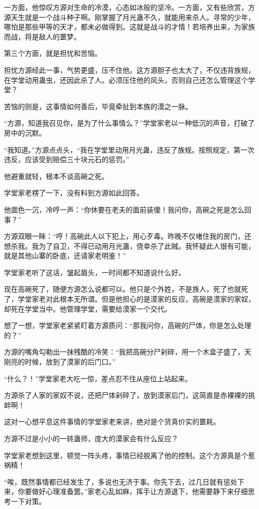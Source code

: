 \begin{this_body}
一方面，他惊叹方源对生命的冷漠，心态如冰般的坚冷。一方面，又有些欣赏，方源天生就是一个战斗种子啊。刚掌握了月光蛊不久，就能用来杀人。寻常的少年，哪怕是那些甲等的天才，都未必做得到。这就是战斗的才情！若培养出来，为家族而战，将是敌人的噩梦。

第三个方面，就是担忧和苦恼。

担忧方源经此一事，气势更盛，压不住他。这方源胆子也太大了，不仅违背族规，在学堂动用蛊虫，还因此杀了人。必须压住他的风头，否则自己还怎么管理这个学堂？

苦恼的则是，这事情如何善后，毕竟牵扯到本族的漠之一脉。

“方源，知道我召见你，是为了什么事情么？”学堂家老以一种低沉的声音，打破了房中的沉默。

“我知道。”方源点点头，“我在学堂里动用月光蛊，违反了族规。按照规定，第一次违反，应该受到赔偿三十块元石的惩罚。”

他避重就轻，根本不谈高碗之死。

学堂家老楞了一下，没有料到方源如此回答。

他面色一沉，冷哼一声：“你休要在老夫的面前装傻！我问你，高碗之死是怎么回事？”

方源双眼一眯：“哼！高碗此人以下犯上，用心歹毒。昨晚不仅堵住我的房门，还想杀我。我为了自卫，不得已动用月光蛊，侥幸杀了此贼。我怀疑此人很有可能，就是其他山寨的卧底，还请家老明鉴！”

学堂家老听了这话，皱起眉头，一时间都不知道说什么好。

现在高碗死了，随便方源怎么说都可以。他只是个外姓，不是族人，死了也就死了，学堂家老对此根本无所谓。但是他担心的是漠家的反应，高碗是漠家的家奴，却死在学堂当中。他管理学堂，需要给漠家一个交代。

想了一想，学堂家老紧紧盯着方源质问：“那我问你，高碗的尸体，你是怎么处理的？”

方源的嘴角勾勒出一抹残酷的冷笑：“我把高碗分尸剁碎，用一个木盒子盛了，天刚亮的时候，放到了漠家的后门口。”

“什么？！”学堂家老大吃一惊，差点忍不住从座位上站起来。

方源杀了人家的家奴不说，还把尸体剁碎了，放到漠家后门，这简直是赤裸裸的挑衅啊！

这对一心想平息这件事情的学堂家老来讲，绝对是个货真价实的噩耗。

方源不过是小小的一转蛊师，庞大的漠家会有什么反应？

学堂家老想到这里，顿觉一阵头疼，事情已经脱离了他的控制。这个方源真是个惹祸精！

“唉，既然事情都已经发生了，多说也无济于事。你先下去，过几日就有惩处下来，你要做好心理准备罢。”家老心乱如麻，挥手让方源退下，他需要静下来仔细思考一下对策。

\end{this_body}

